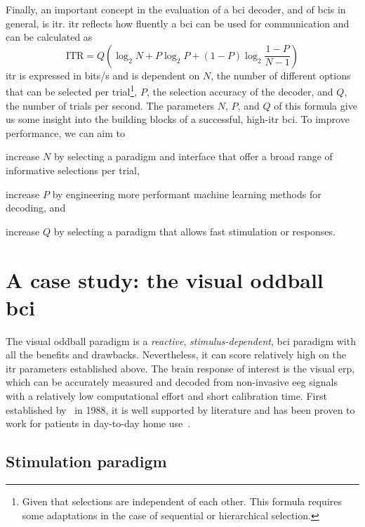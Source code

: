 Finally, an important concept in the evaluation of a \ac{bci} decoder, and of \acp{bci}
in general, is \ac{itr}.
\Ac{itr} reflects how fluently a \ac{bci} can be used for communication and can be
calculated as
\begin{equation}
	\text{ITR} = Q\left(\log_2N+P\log_2P+(1-P)\log_2\frac{1-P}{N-1}\right)
\end{equation}
\Ac{itr} is expressed in bits/s and is dependent on $N$, the number of different options
that can be selected per trial\footnote{Given that selections are independent of each
other. This formula requires some adaptations in the case of sequential or hierarchical
selection.}, $P$, the selection accuracy of the decoder, and $Q$, the number of trials
per second.
The parameters $N$, $P$, and $Q$ of this formula give us some insight into the building
blocks of a successful, high-\ac{itr} \ac{bci}.
To improve performance, we can aim to
\begin{enumerate*}[label={\arabic*})]
\item increase $N$ by selecting a paradigm and interface that offer a broad range of
informative selections per trial,
\item increase $P$ by engineering more performant machine learning methods for decoding,
and
\item increase $Q$ by selecting a paradigm that allows fast stimulation or responses.
\end{enumerate*}

\section{A case study: the visual oddball \acs{bci}}

The visual oddball paradigm is a \emph{reactive}, \emph{stimulus-dependent},
\ac{bci} paradigm with all the benefits and drawbacks.
Nevertheless, it can score relatively high on the \ac{itr} parameters established above.
The brain response of interest is the visual \ac{erp}, which can be accurately measured
and decoded from non-invasive \ac{eeg} signals with a relatively low computational
effort and short calibration time.
First established by~\cite{Farwell1988} in 1988, it is well supported by literature and
has been proven to work for patients in day-to-day home use~\cite{Wolpaw2018}.

\subsection{Stimulation paradigm}

